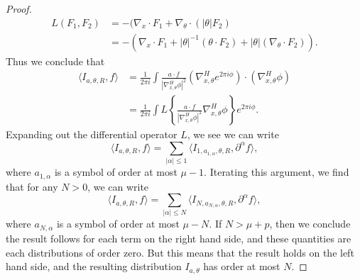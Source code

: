 \begin{proof}
	\begin{align*}
		L(F_1, F_2) &= - ( \nabla_x \cdot F_1 + \nabla_\theta \cdot ( |\theta| F_2 )\\
		&= - \left( \nabla_x \cdot F_1 + |\theta|^{-1} (\theta \cdot F_2) + |\theta| (\nabla_\theta \cdot F_2) \right).
	\end{align*}
	Thus we conclude that
	\begin{align*}
		\langle I_{a,\theta,R}, f \rangle &= \frac{1}{2 \pi i} \int \frac{a \cdot f}{|\nabla_{x,\theta}^H \phi|^2} \left( \nabla_{x,\theta}^H e^{2 \pi i \phi} \right) \cdot (\nabla_{x,\theta}^H \phi)\\
		&= \frac{1}{2 \pi i} \int L \left\{ \frac{a \cdot f}{|\nabla_{x,\theta}^H \phi|^2} \nabla_{x,\theta}^H \phi \right\} e^{2 \pi i \phi}.
	\end{align*}
	Expanding out the differential operator $L$, we see we can write
	\[ \langle I_{a,\theta,R}, f \rangle = \sum_{|\alpha| \leq 1} \langle I_{1,a_{1,\alpha}, \theta, R}, \partial^\alpha f \rangle, \]
	where $a_{1,\alpha}$ is a symbol of order at most $\mu - 1$. Iterating this argument, we find that for any $N > 0$, we can write
	\[ \langle I_{a,\theta,R}, f \rangle = \sum_{|\alpha| \leq N} \langle I_{N,a_{N,\alpha}, \theta, R}, \partial^\alpha f \rangle, \]
	where $a_{N,\alpha}$ is a symbol of order at most $\mu - N$. If $N > \mu + p$, then we conclude the result follows for each term on the right hand side, and these quantities are each distributions of order zero. But this means that the result holds on the left hand side, and the resulting distribution $I_{a,\theta}$ has order at most $N$.
\end{proof}


%
%

